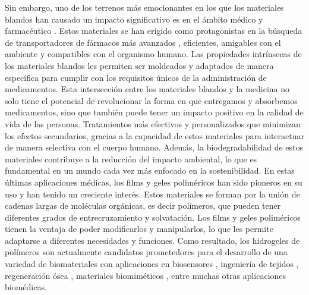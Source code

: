 Sin embargo, uno de los terrenos m\'as emocionantes en los que los materiales blandos han causado un impacto significativo es en el \'ambito m\'edico y farmac\'eutico \cite{rasool2019stimuli}. Estos materiales se han erigido como protagonistas en la b\'usqueda de transportadores de f\'armacos m\'as avanzados \cite{mcclements2017designing,annabi201425th}, eficientes, amigables con el ambiente y compatibles con el organismo humano. Las propiedades intr\'insecas de los materiales blandos les permiten ser moldeados y adaptados de manera espec\'ifica para cumplir con los requisitos \'unicos de la administraci\'on de medicamentos.
Esta intersecci\'on entre los materiales blandos y la medicina no solo tiene el potencial de revolucionar la forma en que entregamos y absorbemos medicamentos, sino que tambi\'en puede tener un impacto positivo en la calidad de vida de las personas. Tratamientos m\'as efectivos y personalizados que minimizan los efectos secundarios, gracias a la capacidad de estos materiales para interactuar de manera selectiva con el cuerpo humano. Adem\'as, la biodegradabilidad de estos materiales contribuye a la reducci\'on del impacto ambiental, lo que es fundamental en un mundo cada vez m\'as enfocado en la sostenibilidad.
En estas \'ultimas aplicaciones m\'edicas, los films y geles polim\'ericos han sido pioneros en su uso y han tenido un creciente inter\'es. Estos materiales se forman por la uni\'on de cadenas largas de mol\'eculas org\'anicas, es decir pol\'imeros, que pueden tener diferentes grados de entrecruzamiento y solvataci\'on. Los films y geles polim\'ericos tienen la ventaja de poder modificarlos y manipularlos, lo que les permite adaptarse a diferentes necesidades y funciones.
Como resultado, los hidrogeles de pol\'imeros son actualmente candidatos prometedores para el desarrollo de una variedad de biomateriales con aplicaciones en biosensores \cite{zhang2012ultrathin,islam2014responsive}, ingenier\'ia de tejidos \cite{matricardi2013interpenetrating,van2011biopolymer}, regeneraci\'on \'osea \cite{bai2018bioactive}, materiales biomim\'eticos \cite{green2016mimicking,wu2010multifunctional}, entre muchas otras aplicaciones biom\'edicas.

